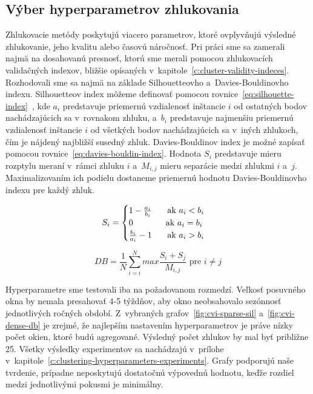 \documentclass[a4paper,twoside,slovak,12pt,appendix]{article}
\begin{document}
\subsection{Výber hyperparametrov zhlukovania}
\label{c:hyperparameter-selection}
Zhlukovacie metódy poskytujú viacero parametrov, ktoré ovplyvňujú výsledné
zhlukovanie, jeho kvalitu alebo časovú náročnosť. Pri práci sme sa zamerali
najmä na dosahovanú presnosť, ktorú sme merali pomocou zhlukovacích validačných
indexov, bližšie opísaných v~kapitole~\ref{c:cluster-validity-indeces}.
Rozhodovali sme sa najmä na základe Silhouetteovho a~Davies-Bouldinovho indexu.
Silhouetteov index môžeme definovať pomocou
rovnice~\ref{eq:silhouette-index}~\cite{Arbelaitz2013}, kde $a_i$ predstavuje
priemernú vzdialenosť inštancie $i$ od ostatných bodov nachádzajúcich sa
v~rovnakom zhluku, a~$b_i$ predstavuje najmenšiu priemernú vzdialenosť inštancie
$i$ od všetkých bodov nachádzajúcich sa v~iných zhlukoch, čím je nájdený
najbližší susedný zhluk. Davies-Bouldinov index je možné zapísať pomocou
rovnice~\ref{eq:davies-bouldin-index}\cite{Arbelaitz2013}. Hodnota $S_i$
predstavuje mieru rozptylu meraní v~rámci zhluku $i$ a~$M_{i, j}$ mieru
separácie medzi zhlukmi $i$ a~$j$. Maximalizovaním ich podielu dostaneme
priemernú hodnotu Davies-Bouldinovho indexu pre každý zhluk.

\begin{equation}
  \label{eq:silhouette-index}
  S_i =
  \begin{cases}
    1 - \frac{a_i}{b_i} \indent \text{ ak } a_i < b_i \\
    0                   \indent \indent \hphantom{a} \text{ ak } a_i = b_i \\
    \frac{b_i}{a_i} - 1 \indent \text{ ak } a_i > b_i \\
  \end{cases}
\end{equation}

\begin{equation}
  \label{eq:davies-bouldin-index}
  DB = \frac{1}{N} \sum^N_{i = i} max \frac{S_i + S_j}{M_{i, j}} \text{ pre } i \neq j
\end{equation}

\noindent
Hyperparametre sme testovali iba na požadovanom rozmedzí. Veľkosť posuvného okna
by nemala presahovať 4-5 týždňov, aby okno neobsahovalo sezónnosť jednotlivých
ročných období. Z~vybraných grafov~\ref{fig:cvi-sparse-sil}
a~\ref{fig:cvi-dense-db} je zrejmé, že najlepším nastavením hyperparametrov je
práve nízky počet okien, ktoré budú agregované. Výsledný počet zhlukov by mal
byť približne 25. Všetky výsledky experimentov sa nachádzajú v~prílohe
v~kapitole~\ref{c:clustering-hyperparameters-experiments}. Grafy podporujú naše
tvrdenie, prípadne neposkytujú dostatočnú výpovednú hodnotu, keďže rozdiel medzi
jednotlivými pokusmi je minimálny.
\end{document}
